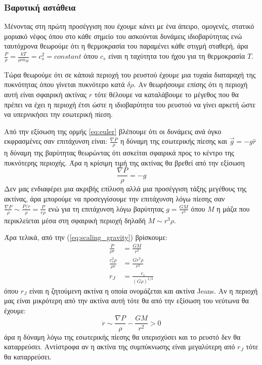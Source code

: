 \documentclass[a4paper,12pt]{memoir}
\begin{document}
\subsubsection{Βαρυτική αστάθεια}
Μένοντας στη πρώτη προσέγγιση που έχουμε κάνει με ένα άπειρο, ομογενές, στατικό μοριακό νέφος όπου στο κάθε σημείο του ασκούνται δυνάμεις ιδιοβαρύτητας ενώ ταυτόχρονα θεωρούμε ότι η θερμοκρασία του παραμένει κάθε στιγμή σταθερή, άρα $\frac{P}{\rho}=\frac{kT}{\mu m_{H}}=c_s^2=constant$ όπου $c_s$ είναι η ταχύτητα του ήχου για τη θερμοκρασία $T$.

Τώρα θεωρούμε ότι σε κάποιά περιοχή του ρευστού έχουμε μια τυχαία διαταραχή της πυκνότητας όπου γίνεται πυκνότερο κατά $\delta \rho$. Αν θεωρήσουμε επίσης ότι η περιοχή αυτή είναι σφαιρική ακτίνας $r$ τότε θέλουμε να καταλάβουμε το μέγεθος που θα πρέπει να έχει η περιοχή έτσι ώστε η ιδιοβαρύτητα του ρευστού να γίνει αρκετή ώστε να υπερνικήσει την εσωτερική πίεση.

Από την εξίσωση της ορμής \ref{eq:euler} βλέπουμε ότι οι δυνάμεις ανά όγκο εκφρασμένες σαν επιτάχυνση είναι: $\frac{\nabla P}{\rho}$ η δύναμη της εσωτερικής πίεσης και $\vec{g}=-g \hat{r}$ η δύναμη της βαρύτητας θεωρώντας ότι ασκείται σφαιρικά προς το κέντρο της πυκνότερης περιοχής.
Άρα η κρίσιμη τιμή της ακτίνας θα βρεθεί από την εξίσωση
\begin{equation} 
\label{eq:scaling_gravity}
\frac{\nabla P}{\rho} =-g
\end{equation}
Δεν μας ενδιαφέρει μια ακριβής επίλυση αλλά μια προσέγγιση τάξης μεγέθους της ακτίνας, άρα μπορούμε να προσεγγίσουμε την επιτάχυνση λόγω πίεσης σαν $\frac{\nabla P}{\rho} \sim \frac{P/r}{\rho}=\frac{P}{r \rho}$ ενώ για τη επιτάχυνση λόγω βαρύτητας $g=\frac{GM}{r^2}$ όπου $M$ η μάζα που περικλείεται μέσα στη σφαιρική περιοχή δηλαδή $M \sim r^3 \rho$.

Άρα τελικά, από την (\ref{eq:scaling_gravity}) βρίσκουμε:
\begin{align}
\frac{P}{\rho r} &= \frac{GM}{r^2} \\
\frac{c_s ^2 \rho}{\rho r} &= \frac{Gr^3 \rho}{r^2} \\
r_J&=\frac{c_s}{(G \rho)^{1/2}}
\end{align}
όπου $r_{J}$ είναι η ζητούμενη ακτίνα η οποία ονομάζεται και ακτίνα Jeans. Αν η περιοχή μας είναι μικρότερη από την ακτίνα αυτή τότε θα από την εξίσωση του νεύτωνα θα έχουμε: 
\begin{equation}
\label{eq:newton}
\ddot{r} \sim \frac{\nabla P}{\rho} -\frac{GM}{r^2} > 0
\end{equation}
άρα η δύναμη λόγω της εσωτερικής πίεσης θα υπερισχύσει και το ρευστό δεν θα καταρρεύσει. Αντίστροφα αν η ακτίνα της συμπύκνωσης είναι μεγαλύτερη από $r_J$ τότε θα καταρρεύσει.
\end{document}
